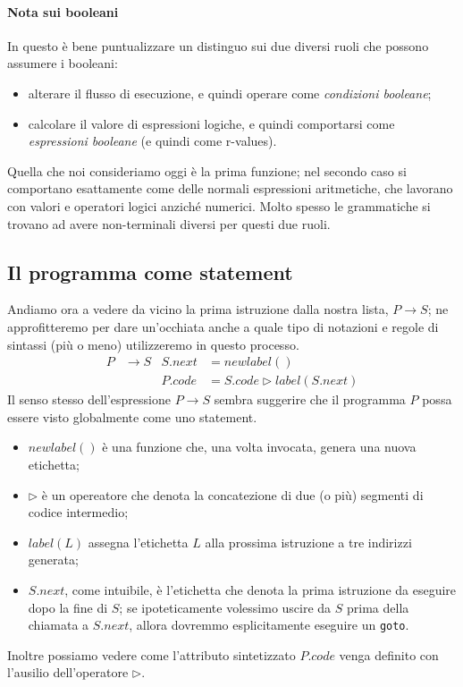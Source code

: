 \documentclass[class=book, crop=false, oneside, 12pt]{standalone}
\begin{document}
\paragraph{Nota sui booleani}
In questo è bene puntualizzare un distinguo sui due diversi ruoli che possono assumere i booleani:
\begin{itemize}
    \item alterare il flusso di esecuzione, e quindi operare come \emph{condizioni booleane};
    \item calcolare il valore di espressioni logiche, e quindi comportarsi come \emph{espressioni booleane} (e quindi come r-values).
\end{itemize}
Quella che noi consideriamo oggi è la prima funzione; nel secondo caso si comportano esattamente come delle normali espressioni aritmetiche, che lavorano con valori e operatori logici anziché numerici. Molto spesso le grammatiche si trovano ad avere non-terminali diversi per questi due ruoli.

\subsection{Il programma come statement}
Andiamo ora a vedere da vicino la prima istruzione dalla nostra lista, \(P \to S\); ne approfitteremo per dare un'occhiata anche a quale tipo di notazioni e regole di sintassi (più o meno) utilizzeremo in questo processo.
\begin{align*}
    P &\to S & S.next &= newlabel() \\
    & & P.code &= S.code \triangleright label(S.next)
\end{align*}
Il senso stesso dell'espressione \(P \to S\) sembra suggerire che il programma \(P\) possa essere visto globalmente come uno statement.
\begin{itemize}
    \item \(newlabel()\) è una funzione che, una volta invocata, genera una nuova etichetta;
    \item \(\triangleright\) è un opereatore che denota la concatezione di due (o più) segmenti di codice intermedio;
    \item \(label(L)\) assegna l'etichetta \(L\) alla prossima istruzione a tre indirizzi generata;
    \item \(S.next\), come intuibile, è l'etichetta che denota la prima istruzione da eseguire dopo la fine di \(S\); se ipoteticamente volessimo uscire da \(S\) prima della chiamata a \(S.next\), allora dovremmo esplicitamente eseguire un \texttt{goto}.
\end{itemize}
Inoltre possiamo vedere come l'attributo sintetizzato \(P.code\) venga definito con l'ausilio dell'operatore \(\triangleright\).
\end{document}
